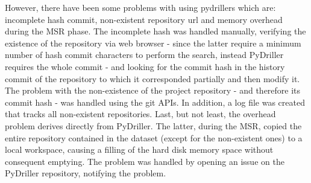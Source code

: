 \documentclass[twocolumn,10pt]{asme2ej}
\begin{document}
However, there have been some problems with using pydrillers which are: incomplete hash commit, non-existent repository url and memory overhead during the MSR phase.
The incomplete hash was handled manually, verifying the existence of the repository via web browser - since the latter require a minimum number of hash commit characters to perform the search, instead PyDriller requires the whole commit - and looking for the commit hash in the history commit  of the repository to which it corresponded partially and then modify it.
The problem with the non-existence of the project repository - and therefore its commit hash - was handled using the git APIs. In addition, a log file was created that tracks all non-existent repositories. Last, but not least, the overhead problem derives directly from PyDriller. The latter, during the MSR, copied the entire repository contained in the dataset (except for the non-existent ones) to a local workspace, causing a filling of the hard disk memory space without consequent emptying. The problem was handled by opening an issue on the PyDriller repository, notifying the problem.
\end{document}
